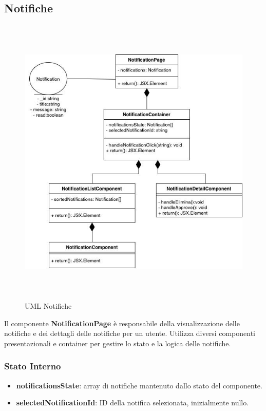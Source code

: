 \documentclass{article}
\begin{document}
\subsection{Notifiche}
\begin{figure}[H]
    \centering
    \includegraphics[width=1\textwidth, height=400pt]{documenti/imgUMLFrontend/Notifica.jpg}
    \caption{UML Notifiche}
    \label{fig:uml-notifiche}
\end{figure}

Il componente \textbf{NotificationPage} è responsabile della visualizzazione delle notifiche e dei dettagli delle notifiche per un utente. Utilizza diversi componenti presentazionali e container per gestire lo stato e la logica delle notifiche.

\subsubsection*{Stato Interno}
\begin{itemize}
    \item \textbf{notificationsState}: array di notifiche mantenuto dallo stato del componente.
    \item \textbf{selectedNotificationId}: ID della notifica selezionata, inizialmente nullo.
\end{itemize}
\end{document}
